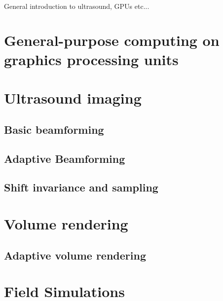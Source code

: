 %

General introduction to ultrasound, GPUs etc...

\section{General-purpose computing on graphics processing units}

\section {Ultrasound imaging}
							
\subsection{Basic beamforming}

\subsection{Adaptive Beamforming}
						
\subsection{Shift invariance and sampling}

\section{Volume rendering}

\subsection{Adaptive volume rendering}

\section{Field Simulations}
			
\endinput
